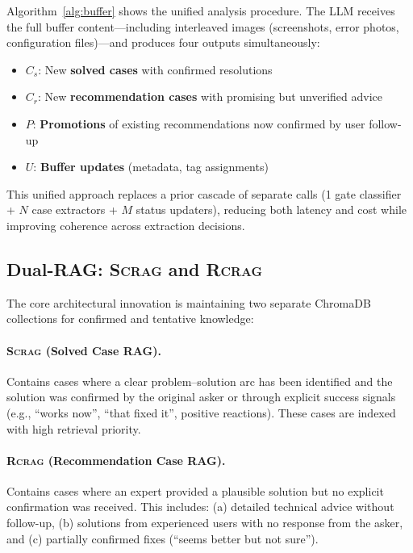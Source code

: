 \documentclass[11pt]{article}
\newcommand{\scrag}{\textsc{Scrag}}
\newcommand{\rcrag}{\textsc{Rcrag}}
\begin{document}
Algorithm~\ref{alg:buffer} shows the unified analysis procedure. The LLM receives the full buffer content---including interleaved images (screenshots, error photos, configuration files)---and produces four outputs simultaneously:
\begin{itemize}
    \item $C_s$: New \textbf{solved cases} with confirmed resolutions
    \item $C_r$: New \textbf{recommendation cases} with promising but unverified advice
    \item $P$: \textbf{Promotions} of existing recommendations now confirmed by user follow-up
    \item $U$: \textbf{Buffer updates} (metadata, tag assignments)
\end{itemize}

This unified approach replaces a prior cascade of separate calls (1 gate classifier + $N$ case extractors + $M$ status updaters), reducing both latency and cost while improving coherence across extraction decisions.

\subsection{Dual-RAG: \scrag{} and \rcrag{}}
\label{sec:dualrag}

The core architectural innovation is maintaining two separate ChromaDB collections for confirmed and tentative knowledge:

\paragraph{\scrag{} (Solved Case RAG).} Contains cases where a clear problem--solution arc has been identified and the solution was confirmed by the original asker or through explicit success signals (e.g., ``works now'', ``that fixed it'', positive reactions). These cases are indexed with high retrieval priority.

\paragraph{\rcrag{} (Recommendation Case RAG).} Contains cases where an expert provided a plausible solution but no explicit confirmation was received. This includes: (a) detailed technical advice without follow-up, (b) solutions from experienced users with no response from the asker, and (c) partially confirmed fixes (``seems better but not sure'').
\end{document}

